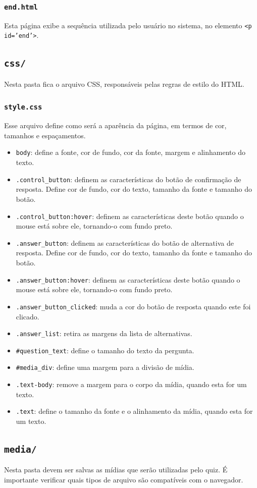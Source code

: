 \documentclass{article}
\begin{document}
\subsubsection{\texttt{end.html}}
Esta página exibe a sequência utilizada pelo usuário no sistema, no elemento \texttt{<p id='end'\textgreater}.

\subsection{\texttt{css/}}
Nesta pasta fica o arquivo CSS, responsáveis pelas regras de estilo do HTML.

\subsubsection{\texttt{style.css}}
Esse arquivo define como será a aparência da página, em termos de cor, tamanhos e espaçamentos.

\begin{itemize}

\item \texttt{body}: define a fonte, cor de fundo, cor da fonte, margem e alinhamento do texto.

\item \texttt{.control\_button}: definem as características do botão de confirmação de resposta. Define cor de fundo, cor do texto, tamanho da fonte e tamanho do botão.

\item \texttt{.control\_button:hover}: definem as características deste botão quando o mouse está sobre ele, tornando-o com fundo preto.

\item \texttt{.answer\_button}: definem as características do botão de alternativa de resposta. Define cor de fundo, cor do texto, tamanho da fonte e tamanho do botão.

\item \texttt{.answer\_button:hover}: definem as características deste botão quando o mouse está sobre ele, tornando-o com fundo preto.

\item \texttt{.answer\_button\_clicked}: muda a cor do botão de resposta quando este foi clicado.

\item \texttt{.answer\_list}: retira as margens da lista de alternativas.

\item \texttt{\#question\_text}: define o tamanho do texto da pergunta.

\item \texttt{\#media\_div}: define uma margem para a divisão de mídia.

\item \texttt{.text-body}: remove a margem para o corpo da mídia, quando esta for um texto.

\item \texttt{.text}: define o tamanho da fonte e o alinhamento da mídia, quando esta for um texto.

\end{itemize}

\subsection{\texttt{media/}}
	Nesta pasta devem ser salvas as mídias que serão utilizadas pelo quiz. É importante verificar quais tipos de arquivo são compatíveis com o navegador.
\end{document}

